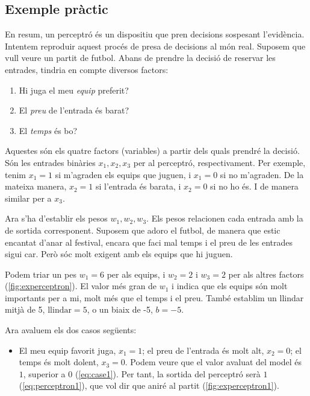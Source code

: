 \begin{refsection}
	\subsection{Exemple pràctic}
	
	En resum, un perceptró és un dispositiu que pren decisions sospesant l'evidència.\supercite{MPerceptron1,nielsen} Intentem reproduir aquest procés de presa de decisions al món real. Suposem que vull veure un partit de futbol. Abans de prendre la decisió de reservar les entrades, tindria en compte diversos factors:

	\begin{enumerate}
		\item Hi juga el meu \textit{equip} preferit?
		\item El \textit{preu} de l'entrada és barat?
		\item El \textit{temps} és bo?
	\end{enumerate}

	Aquestes són els quatre factors (variables) a partir dels quals prendré la decisió. Són les entrades binàries $x_1,x_2,x_3$ per al perceptró, respectivament. Per exemple, tenim $x_1=1$ si m'agraden els equips que juguen, i $x_1=0$ si no m'agraden. De la mateixa manera, $x_2=1$ si l'entrada és barata, i $x_2=0$ si no ho és. I de manera similar per a $x_3$.

	Ara s'ha d'establir els pesos $w_1,w_2,w_3$. Els pesos relacionen cada entrada amb la de sortida corresponent. Suposem que adoro el futbol, de manera que estic encantat d'anar al festival, encara que faci mal temps i el preu de les entrades sigui car. Però sóc molt exigent amb els equips que hi juguen.

	Podem triar un pes $w_1=6$ per als equips, i $w_2=2$ i $w_3=2$ per als altres factors (\cref{fig:experceptron}). El valor més gran de $w_1$ i indica que els equips són molt importants per a mi, molt més que el temps i el preu. També establim un llindar mitjà de 5, $\mathrm{llindar}=5$, o un biaix de -5, $b=-5$.

	Ara avaluem els dos casos següents:

	\begin{itemize}

		\item El meu equip favorit juga, $x_1=1$; el preu de l'entrada és molt alt, $x_2=0$; el temps és molt dolent, $x_3=0$. Podem veure que el valor avaluat del model és $1$, superior a $0$ (\cref{eq:case1}). Per tant, la sortida del perceptró serà $1$ (\cref{eq:perceptron1}), que vol dir que aniré al partit (\cref{fig:experceptron1}).


\end{itemize}
\end{refsection}
